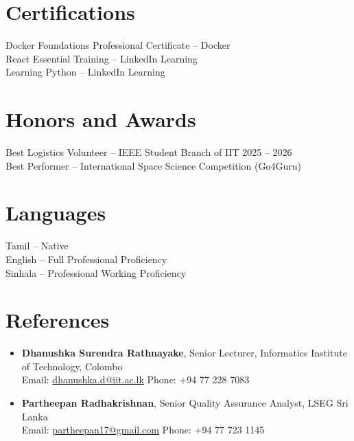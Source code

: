 \documentclass[letterpaper,10pt]{article}
\begin{document}
\section{Certifications}
Docker Foundations Professional Certificate -- Docker \\
React Essential Training -- LinkedIn Learning \\
Learning Python -- LinkedIn Learning

\section{Honors and Awards}
Best Logistics Volunteer -- IEEE Student Branch of IIT \hfill 2025 -- 2026 \\
Best Performer -- International Space Science Competition (Go4Guru)

\section{Languages}
Tamil -- Native \\
English -- Full Professional Proficiency \\
Sinhala -- Professional Working Proficiency

\section{References}
\begin{itemize}
  \item \textbf{Dhanushka Surendra Rathnayake}, Senior Lecturer, Informatics Institute of Technology, Colombo \\
  Email: \href{mailto:dhanushka.d@iit.ac.lk}{dhanushka.d@iit.ac.lk} \quad Phone: +94 77 228 7083
  \item \textbf{Partheepan Radhakrishnan}, Senior Quality Assurance Analyst, LSEG Sri Lanka \\
  Email: \href{mailto:partheepan17@gmail.com}{partheepan17@gmail.com} \quad Phone: +94 77 723 1145
\end{itemize}
\end{document}
